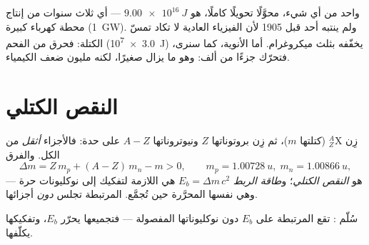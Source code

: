 \begin{example}\label{ex:g12:nuclear-energy:fortune}
 واحد من أي شيء، محوَّلًا تحويلًا كاملًا، هو $\qty{9.00e16}{J}$ --- أي ثلاث
سنوات من إنتاج محطة كهرباء كبيرة (\qty{1}{GW}). ولم ينتبه أحد قبل
1905 لأن الفيزياء العادية لا تكاد تمسّ الكتلة: فحرق  من الفحم
(\qty{3.0e7}{J}) يخفّفه بثلث ميكروغرام. أما الأنوية، كما سنرى،
فتحرّك جزءًا من ألف: وهو ما يزال صغيرًا، لكنه مليون ضعف الكيمياء.
\end{example}

\section{النقص الكتلي}

\begin{definition}\label{def:g12:nuclear-energy:defect}
زِن  ${}^{A}_{Z}\mathrm{X}$ (كتلتها $m$)، ثم زِن بروتوناتها $Z$
ونيوتروناتها $A - Z$ على حدة: فالأجزاء \emph{أثقل} من الكل.
والفرق
\[
\Delta m = Z\,m_p + (A - Z)\,m_n - m > 0,
\qquad m_p = \qty{1.00728}{u},\; m_n = \qty{1.00866}{u},
\]
هو \emph{النقص الكتلي}؛ و\emph{طاقة
الربط} $E_b = \Delta m\,c^2$ هي  اللازمة
لتفكيك  إلى نوكليونات حرة --- وهي نفسها  المحرَّرة
حين تُجمَّع.  المرتبطة تجلس \emph{دون} أجزائها.
\end{definition}

\begin{omfigure}

{\small سُلّم : تقع  المرتبطة على $E_b$ دون نوكليوناتها
المفصولة --- فتجميعها يحرّر $E_b$، وتفكيكها يكلّفها.}
\end{omfigure}

